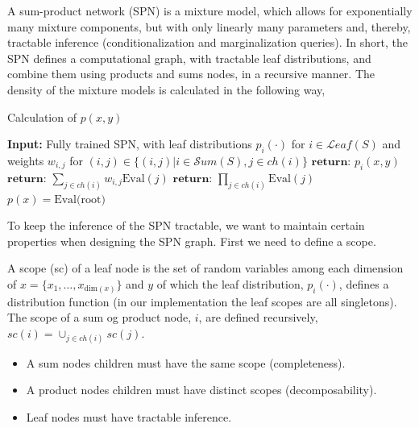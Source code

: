 A sum-product network (SPN) is a mixture model, which allows for exponentially many mixture
components, but with only linearly many parameters and, thereby, tractable inference
(conditionalization and marginalization queries). In short, the SPN defines a computational graph,
with tractable leaf distributions, and combine them using products and sums nodes, in a recursive
manner. The density of the mixture models is calculated in the following way, 
\begin{algorithm}
    \caption*{Calculation of $p(x,y)$}\label{SPN_1}
    \begin{algorithmic}
    \State \textbf{Input:} Fully trained SPN, with leaf distributions $p_i(\cdot)$ for $i\in \mathcal{L}eaf(S)$ and weights 
    $w_{i,j}$ for $(i,j) \in \{(i,j)|i \in \mathcal{S}um(S), j \in ch(i)\}$ 
        \State  $\textbf{return: } p_i(x,y)$ 
    \EndIf
        \State $\textbf{return: } \sum_{j\in ch(i)} w_{i,j} \text{Eval}(j)$
    \EndIf
        \State $\textbf{return: } \prod_{j \in ch(i)} \text{Eval}(j)$
    \EndIf
    \EndFunction
    \State $p(x) =  \text{Eval(root)}$
    \end{algorithmic}
\end{algorithm}

To keep the inference of the SPN tractable, we want to maintain certain properties when
designing the SPN graph. First we need to define a scope. 
\begin{testexample}
    A scope (sc) of a leaf node is the set of random variables among each dimension of $x = \{x_1,
    \dots, x_{\text{dim}(x)} \}$ and $y$ of which the leaf distribution,
    $p_i(\cdot)$, defines a distribution function (in our implementation the leaf scopes are all
    singletons). The scope of a sum og product node, $i$, are defined recursively, $sc(i) = \cup_{j \in
    ch(i)} sc(j)$. 
\end{testexample}

\begin{itemize}[noitemsep]
    \item A sum nodes children must have the same scope (completeness). 
    \item A product nodes children must have distinct scopes (decomposability).
    \item Leaf nodes must have tractable inference.
\end{itemize}

